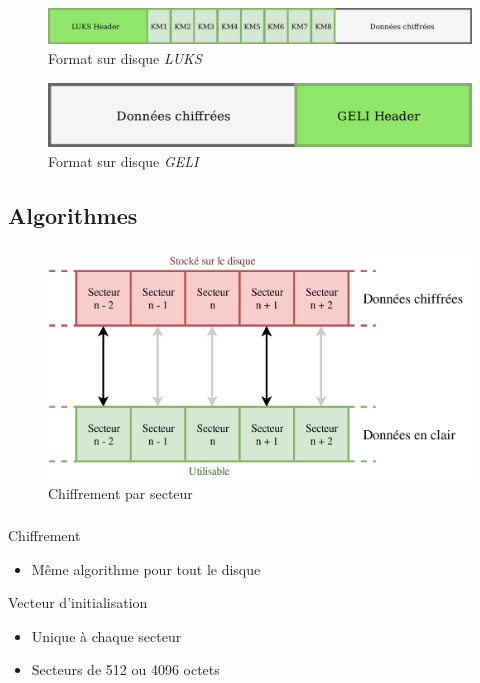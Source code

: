 \begin{frame}
  \frametitle{\insertsubsectionhead}
  \begin{figure}
    \includegraphics[width=\textwidth]{etat_art/format_disque_luks}
    \caption{Format sur disque \textit{LUKS}}
  \end{figure}
  \vfill
  \begin{figure}
    \includegraphics[width=.6\textwidth]{etat_art/format_disque_geli}
    \caption{Format sur disque \textit{GELI}}
  \end{figure}
\end{frame}

\subsection{Algorithmes}

\begin{frame}
  \frametitle{\insertsubsectionhead}
  \begin{figure}
    \includegraphics[width=.9\textwidth]{etat_art/disk_sectors}
    \caption{Chiffrement par secteur}
  \end{figure}
\end{frame}

\begin{frame}
  \frametitle{\insertsubsectionhead}
  \begin{block}{Chiffrement}
    \begin{itemize}
    \item Même algorithme pour tout le disque
    \end{itemize}
  \end{block}
  \begin{block}{Vecteur d'initialisation}
    \begin{itemize}
    \item Unique à chaque secteur
    \item Secteurs de 512 ou 4096 octets
    \end{itemize}
  \end{block}
\end{frame}

